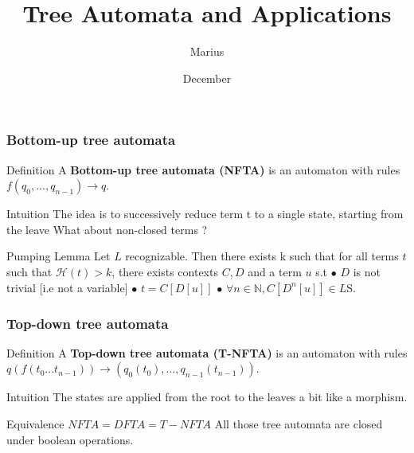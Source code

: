 \documentclass[pdf]{beamer}
\title{Tree Automata and Applications}
\author{Marius }
\date{December}
\newcommand{\mc}[1]{\mathcal{#1}} %
\newcommand{\N}{\ensuremath{\mathbb{N}}}
\begin{document}
\maketitle
\begin{frame}
\frametitle{Bottom-up tree automata}
\begin{block}{Definition}
A \textbf{Bottom-up tree automata (NFTA)} is an automaton with rules $f(q_0,...,q_{n-1}) \rightarrow q$.
\end{block}


\begin{exampleblock}{Intuition}
The idea is to successively reduce term t to a single state, starting from the leave \newline
What about non-closed terms ?
\end{exampleblock}


\begin{alertblock}{Pumping Lemma}
Let $L$ recognizable.\newline 
Then there exists k such that for all terms $t$ such that $\mc{H}(t) > k$, there exists contexts $C,D$ and a term $u$ s.t \newline
$\bullet$ $D$ is not trivial [i.e not a variable] \newline
$\bullet$ $t = C[D[u]]$ \newline
$\bullet$ $\forall n \in \N, C[D^n[u]] \in L$S. \newline
\end{alertblock}
\end{frame}

\begin{frame}
\frametitle{Top-down tree automata}

\begin{block}{Definition}
A \textbf{Top-down tree automata (T-NFTA)} is an automaton with rules $q(f(t_0...t_{n-1})) \rightarrow (q_0(t_0),...,q_{n-1}(t_{n-1}))$.
\end{block}


\begin{exampleblock}{Intuition}
The states are applied from the root to the leaves a bit like a morphism.\newline
\end{exampleblock}

\begin{alertblock}{Equivalence}
$NFTA=DFTA=	T-NFTA$\newline
All those tree automata are closed under boolean operations.
\end{alertblock}
\end{frame}
\end{document}
